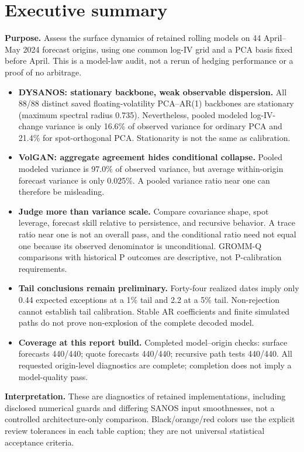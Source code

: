 \documentclass[11pt]{article}
\begin{document}
\section*{Executive summary}
\textbf{Purpose.} Assess the surface dynamics of retained rolling models on 44 April--May 2024 forecast origins, using one common log-IV grid and a PCA basis fixed before April. This is a model-law audit, not a rerun of hedging performance or a proof of no arbitrage.
\begin{itemize}
\item \textbf{DYSANOS: stationary backbone, weak observable dispersion.} All 88/88 distinct saved floating-volatility PCA--AR(1) backbones are stationary (maximum spectral radius 0.735). Nevertheless, pooled modeled log-IV-change variance is only 16.6\% of observed variance for ordinary PCA and 21.4\% for spot-orthogonal PCA. Stationarity is not the same as calibration.
\item \textbf{VolGAN: aggregate agreement hides conditional collapse.} Pooled modeled variance is 97.0\% of observed variance, but average within-origin forecast variance is only 0.025\%. A pooled variance ratio near one can therefore be misleading.
\item \textbf{Judge more than variance scale.} Compare covariance shape, spot leverage, forecast skill relative to persistence, and recursive behavior. A trace ratio near one is not an overall pass, and the conditional ratio need not equal one because its observed denominator is unconditional. GROMM-Q comparisons with historical P outcomes are descriptive, not P-calibration requirements.
\item \textbf{Tail conclusions remain preliminary.} Forty-four realized dates imply only 0.44 expected exceptions at a 1\% tail and 2.2 at a 5\% tail. Non-rejection cannot establish tail calibration. Stable AR coefficients and finite simulated paths do not prove non-explosion of the complete decoded model.
\item \textbf{Coverage at this report build.} Completed model--origin checks: surface forecasts 440/440; quote forecasts 440/440; recursive path tests 440/440. All requested origin-level diagnostics are complete; completion does not imply a model-quality pass.
\end{itemize}
\textbf{Interpretation.} These are diagnostics of retained implementations, including disclosed numerical guards and differing SANOS input smoothnesses, not a controlled architecture-only comparison. Black/orange/red colors use the explicit review tolerances in each table caption; they are not universal statistical acceptance criteria.
\clearpage
\end{document}

